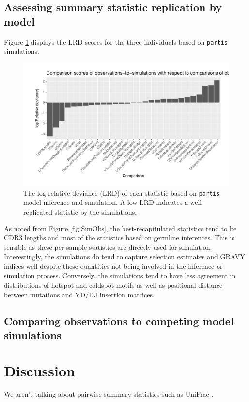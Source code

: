 \documentclass{article}
\begin{document}
\subsection*{Assessing summary statistic replication by model}
Figure \ref{Scores} displays the LRD scores for the three individuals based on \texttt{partis} simulations.
\begin{figure}
    \includegraphics[width=\linewidth]{Figures/score_plot.pdf}
    \caption{The log relative deviance (LRD) of each statistic based on \texttt{partis} model inference and simulation.
        A low LRD indicates a well-replicated statistic by the simulations.
    }
    \label{Scores}
\end{figure}
As noted from Figure \ref{fig:SimObs}, the best-recapitulated statistics tend to be CDR3 lengths and most of the statistics based on germline inferences.
This is sensible as these per-sample statistics are directly used for simulation.
Interestingly, the simulations do tend to capture selection estimates and GRAVY indices well despite these quantities not being involved in the inference or simulation process.
Conversely, the simulations tend to have less agreement in distributions of hotspot and coldspot motifs as well as positional distance between mutations and VD/DJ insertion matrices.

\subsection*{Comparing observations to competing model simulations}

\section*{Discussion}
We aren't talking about pairwise summary statistics such as UniFrac \cite{De_Bourcy2017-pu}.




\end{document}
